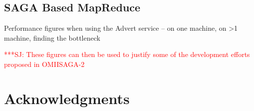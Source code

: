 \documentclass{rspublic}
\newcommand{\jhanote}[1]{ {\textcolor{red} { ***SJ: #1 }}}
\newcommand{\jhanote}[1]{}
\begin{document}
\subsection*{SAGA Based MapReduce}

Performance figures when using the Advert service -- on one machine,
on >1 machine, finding the bottleneck

\jhanote{These figures can then be used to justify some of the 
  development efforts proposed in OMIISAGA-2}

\section{Acknowledgments}



\end{document}
